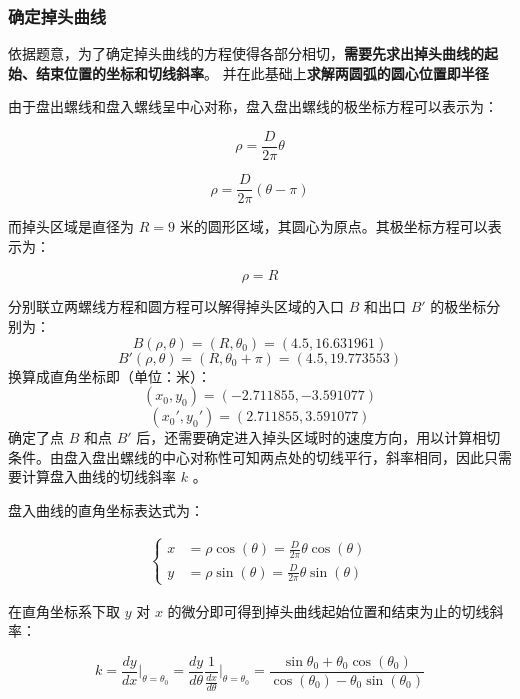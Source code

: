 \documentclass[a4paper]{article}
\begin{document}
	\subsubsection{确定掉头曲线}
	
	依据题意，为了确定掉头曲线的方程使得各部分相切，\textbf{需要先求出掉头曲线的起始、结束位置的坐标和切线斜率}。
	并在此基础上\textbf{求解两圆弧的圆心位置即半径}
	
	由于盘出螺线和盘入螺线呈中心对称，盘入盘出螺线的极坐标方程可以表示为：
	
	\begin{equation}
		\rho = \frac{D}{2\pi} \theta
	\end{equation}
	
	\begin{equation}
		\rho = \frac{D}{2\pi} (\theta - \pi)
	\end{equation}
	
	而掉头区域是直径为 $R = 9$ 米的圆形区域，其圆心为原点。其极坐标方程可以表示为：
	
	\begin{equation}
		\rho = R
	\end{equation}
	
	分别联立两螺线方程和圆方程可以解得掉头区域的入口 $B$ 和出口 $B'$ 的极坐标分别为：
	$$ B(\rho, \theta) = (R, \theta_0) = (4.5, 16.631961) $$
	$$ B'(\rho, \theta) = (R, \theta_0 + \pi) = (4.5, 19.773553)$$
	换算成直角坐标即（单位：米）：
	$$ (x_0, y_0) = (-2.711855, -3.591077) $$
	$$ (x_0', y_0') = (2.711855, 3.591077) $$
	确定了点 $B$ 和点 $B'$ 后，还需要确定进入掉头区域时的速度方向，用以计算相切条件。由盘入盘出螺线的中心对称性可知两点处的切线平行，斜率相同，因此只需要计算盘入曲线的切线斜率 $k$ 。
	
	盘入曲线的直角坐标表达式为：
	
	\begin{align}
		\left\{
		\begin{aligned}
			x &= \rho \cos(\theta) = \frac{D}{2\pi} \theta \cos(\theta) \\
			y &= \rho \sin(\theta) = \frac{D}{2\pi} \theta \sin(\theta)
		\end{aligned}
		\right.
	\end{align}
	
	在直角坐标系下取 $y$ 对 $x$ 的微分即可得到掉头曲线起始位置和结束为止的切线斜率：
	
	\begin{equation}
		k = \frac{dy}{dx}\Bigg|_{\theta=\theta_0} = \frac{dy}{d\theta} \frac{1}{\frac{dx}{d\theta}} \Bigg|_{\theta=\theta_0} = \frac{\sin\theta_0 + \theta_0 \cos(\theta_0)}{\cos(\theta_0) - \theta_0 \sin(\theta_0)}
	\end{equation}
	
\end{document}
